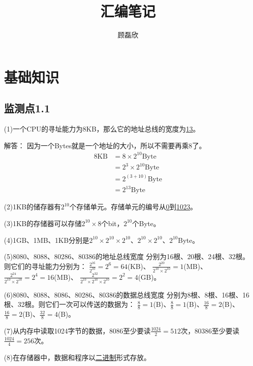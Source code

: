 \documentclass{elegantnote}
\title{汇编笔记}
\author{顾磊欣}
\begin{document}
    \maketitle
    \section{基础知识}
    \subsection*{监测点1.1}
    (1)一个CPU的寻址能力为8KB，那么它的地址总线的宽度为\underline{13}。\par
    解答：
    因为一个Bytes就是一个地址的大小，所以不需要再乘8了。
    \begin{align*}
        8\text{KB}&= 8\times2^{10}\text{Byte} \\
        & =2^3\times2^{10}\text{Byte} \\
        & = 2^{(3+10)}\text{Byte} \\
        & = 2^{13}\text{Byte}
    \end{align*}\par
    (2)1KB的储存器有\underline{$2^{10}$}个存储单元。存储单元的编号从\underline{0}到\underline{1023}。\par
    (3)1KB的存储器可以存储\underline{$2^{10}\times8$}个bit，\underline{$2^{10}$}个Byte。\par
    (4)1GB、1MB、1KB分别是\underline{$2^{10}\times2^{10}\times2^{10}$}、\underline{$2^{10}\times2^{10}$}、\underline{$2^{10}$}Byte。\par
    (5)8080、8088、80286、80386的地址总线宽度
    分别为16根、20根、24根、32根。则它们的寻址能力分别为：
    \underline{$\frac{2^{16}}{2^{10}}=2^6=64$}(KB)、
    \underline{$\frac{2^{20}}{2^{10}\times2^{10}}=1$}(MB)、
    \underline{$\frac{2^{24}}{2^{10}\times2^{10}}=2^4=16$}(MB)、
    \underline{$\frac{2^{32}}{2^{10}\times2^{10}\times2^{10}}=2^2=4$}(GB)。\par
    (6)8080、8088、8086、80286、80386的数据总线宽度
    分别为8根、8根、16根、16根、32根。则它们一次可以传送的数据为：
    \underline{$\frac{8}{8}=1$}(B)、\underline{$\frac{8}{8}=1$}(B)、\underline{$\frac{16}{8}=2$}(B)、\underline{$\frac{16}{8}=2$}(B)、\underline{$\frac{32}{8}=4$}(B)。\par
    (7)从内存中读取1024字节的数据，8086至少要读\underline{$\frac{1024}{2}=512$}次，80386至少要读\underline{$\frac{1024}{4}=256$}次。\par
    (8)在存储器中，数据和程序以\underline{二进制}形式存放。\par
\end{document}
